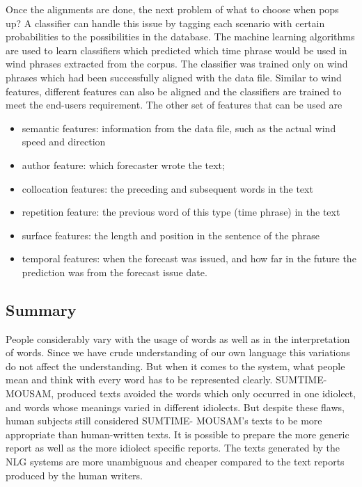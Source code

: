 \documentclass{bmcart}
\begin{document}
Once the alignments are done, the next problem of what to choose when pops up? A classifier can handle this issue by tagging each scenario with certain probabilities to the possibilities in the database. The machine learning algorithms are used to learn classifiers which predicted which time phrase would be used in wind phrases extracted from the corpus. The classifier was trained only on wind phrases which had been successfully aligned with the data file. Similar to wind features, different features can also be aligned and the classifiers are trained to meet the end-users requirement. The other set of features that can be used are
\begin{itemize}
\item semantic features: information from the data file, such as the actual wind speed and direction
\item author feature: which forecaster wrote the text;
\item collocation features: the preceding and subsequent words in the text
\item repetition feature: the previous word of this type (time phrase) in the text
\item surface features: the length and position in the sentence of the phrase 
\item temporal features: when the forecast was issued, and how far in the future the prediction was from the forecast issue date.
\end{itemize}

\subsection{Summary}
\label{ssec:paperSummary}

People considerably vary with the usage of words as well as in the interpretation of words. Since we have crude understanding of our own language this variations do not affect the understanding. But when it comes to the system, what people mean and think with every word has to be represented clearly.
SUMTIME-MOUSAM, produced texts avoided the words which only occurred in one idiolect, and words whose meanings varied in different idiolects. But despite these flaws, human subjects still considered SUMTIME- MOUSAM’s texts to be more appropriate than human-written texts. It is possible to prepare the more generic report as well as the more idiolect specific reports. The texts generated by the NLG systems are more unambiguous and cheaper compared to the text reports produced by the human writers.
\end{document}
